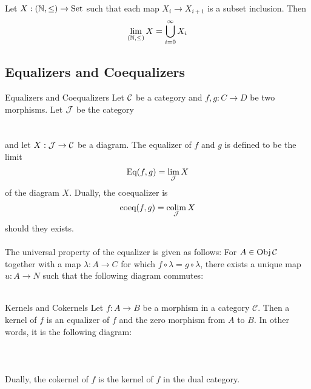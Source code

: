 \documentclass[a4paper]{article}
\begin{document}
\begin{prp}{}{} Let $X:(\mathbb{N},\leq)\to\text{Set}$ such that each map $X_i\to X_{i+1}$ is a subset inclusion. Then $$\lim_{(\mathbb{N},\leq)}X=\bigcup_{i=0}^\infty X_i$$
\end{prp}

\subsection{Equalizers and Coequalizers}
\begin{defn}{Equalizers and Coequalizers}{} Let $\mathcal{C}$ be a category and $f,g:C\to D$ be two morphisms. Let $\mathcal{J}$ be the category \\
\\~\\
and let $X:\mathcal{J}\to\mathcal{C}$ be a diagram. The equalizer of $f$ and $g$ is defined to be the limit $$\text{Eq}(f,g)=\lim_{\mathcal{J}}X$$ of the diagram $X$. Dually, the coequalizer is $$\text{coeq}(f,g)=\operatorname*{colim}_{\mathcal{J}} X$$ should they exists. \\~\\

The universal property of the equalizer is given as follows: For $A\in\operatorname{Obj}\mathcal{C}$ together with a map $\lambda:A\to C$ for which $f\circ\lambda=g\circ\lambda$, there exists a unique map $u:A\to N$ such that the following diagram commutes: \\~\\
\end{defn}

\begin{defn}{Kernels and Cokernels}{} Let $f:A\to B$ be a morphism in a category $\mathcal{C}$. Then a kernel of $f$ is an equalizer of $f$ and the zero morphism from $A$ to $B$. In other words, it is the following diagram: \\~\\
\\~\\
Dually, the cokernel of $f$ is the kernel of $f$ in the dual category. 
\end{defn}
\end{document}
